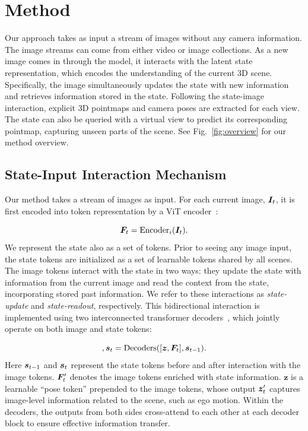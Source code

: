 \section{Method}





Our approach takes as input a stream of images  without any camera information. The image streams can come from either video or image collections. %
As a new image comes in through the model, it interacts with the latent state representation, which encodes the understanding of the current 3D scene. 
Specifically, the image simultaneously updates the state with new information and retrieves information stored in the state.
Following the state-image interaction, explicit 3D pointmaps and camera poses are extracted for each view.
The state can also be queried with a virtual view to predict its corresponding pointmap, capturing unseen parts of the scene. See Fig.~\ref{fig:overview} for our method overview.



\subsection{State-Input Interaction Mechanism}
\label{sec:state-img}

Our method takes a stream of images as input. For each current image, $\bm{I}_t$, it is first encoded into token representation by a ViT encoder~\cite{dosovitskiy2020image}:

\begin{equation}
    \bm{F}_t = \mathrm{Encoder}_i(\bm{I}_t).
\end{equation}
We represent the state also as a set of tokens. Prior to seeing any image input, the state tokens are initialized as a set of learnable tokens shared by all scenes. 
The image tokens interact with the state in two ways: they update the state with information from the current image and read the context from the state, incorporating stored past information.
We refer to these interactions as \textit{state-update} and \textit{state-readout}, respectively.
This bidirectional interaction is implemented using two interconnected transformer decoders~\cite{wang2024dust3r,weinzaepfel2022croco}, which jointly operate on both image and state tokens:

\begin{equation}
    [\zts, \fts], \stcur  = \mathrm{Decoders}([\bm z, \ft], \stpre).
    \label{eq:state-img}
\end{equation}
Here $\bm{s}_{t-1}$ and $\bm{s}_{t}$ represent the state tokens before and after interaction with the image tokens. $\bm{F}_t'$ denotes the image tokens enriched with state information. $\bm z$ is a learnable ``pose token'' prepended to the image tokens,  whose output $\bm{z}_t'$ captures image-level information related to the scene, such as ego motion. %
Within the decoders, the outputs from both sides cross-attend to each other at each decoder block to ensure effective information transfer. 

